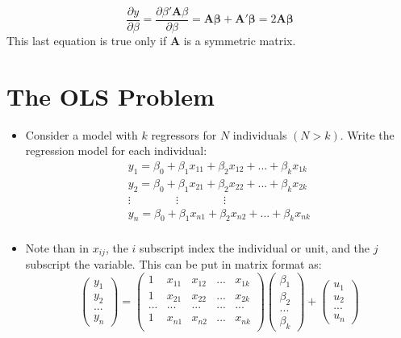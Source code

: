 \documentclass[11pt]{article}
\theoremstyle{definition}
\theoremstyle{remark}
\begin{document}
\begin{itemize}
$$
\frac{\partial y}{\partial \beta} = \frac{\partial \beta'\mathbf{A}\beta}{\partial \beta} = \mathbf{A\beta + A'\beta} = 2\mathbf{A\beta}
$$
This last equation is true only if \textbf{A} is a symmetric matrix.


\end{itemize}

\section{The OLS Problem}
\begin{itemize}
\item Consider a model with $k$ regressors for $N$ individuals $(N > k)$. Write the regression model for each individual:
\begin{equation*}
\begin{split}
y_1 = \beta_0 + \beta_1 x_{11} + \beta_2 x_{12} + ... + \beta_k x_{1k} \\
y_2 = \beta_0 + \beta_1 x_{21} + \beta_2 x_{22} + ... + \beta_k x_{2k} \\
\vdots \quad  \quad \quad \quad \vdots \quad \quad \quad \quad \vdots \\
y_n = \beta_0 + \beta_1 x_{n1} + \beta_2 x_{n2} + ... + \beta_k x_{nk} \\
\end{split}
\end{equation*}
\item Note than in $x_{ij}$, the $i$ subscript index the individual or unit, and the $j$ subscript the variable. This can be put in matrix format as:
$$
\begin{pmatrix}
y_1 \\
y_2 \\
... \\
y_n
\end{pmatrix}
=
\begin{pmatrix}
1&x_{11}&x_{12}&...&x_{1k} \\
1&x_{21}&x_{22}&...&x_{2k} \\
...&...&...&...&... \\
1&x_{n1}&x_{n2}&...&x_{nk} \\
\end{pmatrix}
\begin{pmatrix}
\beta_1 \\
\beta_2 \\
... \\
\beta_k
\end{pmatrix}
+
\begin{pmatrix}
u_1 \\
u_2 \\
... \\
u_n
\end{pmatrix}
$$


\end{itemize}
\end{document}
